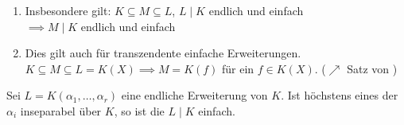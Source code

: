 \begin{remark}
	\begin{enumerate}[label={(\alph*)}]
		\item Insbesondere gilt:
		$K \subseteq M \subseteq L$, $L \mid K$ endlich und einfach\\
		$\implies M \mid K$ endlich und einfach
		\item Dies gilt auch für transzendente einfache Erweiterungen. $K \subseteq M \subseteq L = K(X) \implies M = K(f)$ für ein $f \in K(X)$. ($\nearrow$ Satz von )
	\end{enumerate}
\end{remark}
\begin{theorem}
	Sei $L = K(\alpha_1, \dots, \alpha_r)$ eine endliche Erweiterung von $K$. Ist höchstens eines der $\alpha_i$ inseparabel über $K$, so ist die $L \mid K$ einfach.
\end{theorem}
